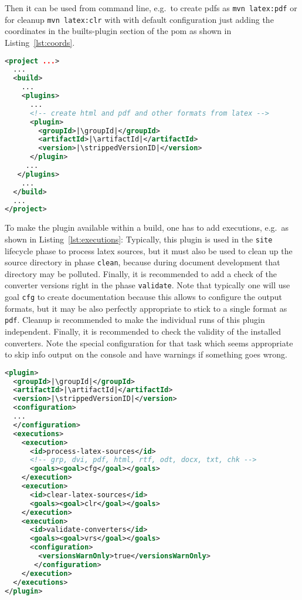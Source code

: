 Then it can be used from command line,
e.g.~to create pdfs as \texttt{mvn latex:pdf}
or for cleanup \texttt{mvn latex:clr} with with default configuration
just adding the coordinates in the builts-plugin section of the pom
as shown in Listing~\ref{lst:coords}. 
%
\begin{lstlisting}[language=xml, basicstyle=\footnotesize,
escapechar=|,
float, captionpos=b, label={lst:coords}, 
caption={The coordinates of this plugin}]
<project ...>
  ...
  <build>
    ...
    <plugins>
      ...
      <!-- create html and pdf and other formats from latex -->
      <plugin>
        <groupId>|\groupId|</groupId>
        <artifactId>|\artifactId|</artifactId>
        <version>|\strippedVersionID|</version>
      </plugin>
     ...
   </plugins>
    ...
  </build>
  ...
</project>
\end{lstlisting}


To make the plugin available within a build,
one has to add executions, e.g.~as shown in Listing~\ref{lst:executions}:
Typically, this plugin is used in the \texttt{site} lifecycle phase 
to process latex sources,
but it must also be used to clean up the source directory
in phase \texttt{clean},
because during document development that directory may be polluted.
Finally, it is recommended to add a check of the converter versions
right in the phase \texttt{validate}.
Note that typically one will use goal \texttt{cfg}
to create documentation because this allows to configure the output formats,
but it may be also perfectly appropriate to stick to a single format
as \texttt{pdf}.
Cleanup is recommended to make the individual runs of this plugin independent.
Finally, it is recommended to check the validity of the installed converters.
Note the special configuration for that task
which seems appropriate to skip info output on the console
and have warnings if something goes wrong. 


\begin{lstlisting}[language=xml, basicstyle=\footnotesize,
escapechar=|,
float, captionpos=hb, label={lst:executions}, 
caption={The executions of this plugin}]
<plugin>
  <groupId>|\groupId|</groupId>
  <artifactId>|\artifactId|</artifactId>
  <version>|\strippedVersionID|</version>
  <configuration>
  ...
  </configuration>
  <executions>
    <execution>
      <id>process-latex-sources</id>
      <!-- grp, dvi, pdf, html, rtf, odt, docx, txt, chk -->
      <goals><goal>cfg</goal></goals>
    </execution>
    <execution>
      <id>clear-latex-sources</id>
      <goals><goal>clr</goal></goals>
    </execution>
    <execution>
      <id>validate-converters</id>
      <goals><goal>vrs</goal></goals>
      <configuration>
        <versionsWarnOnly>true</versionsWarnOnly>
       </configuration>
    </execution>
  </executions>
</plugin>
\end{lstlisting}

